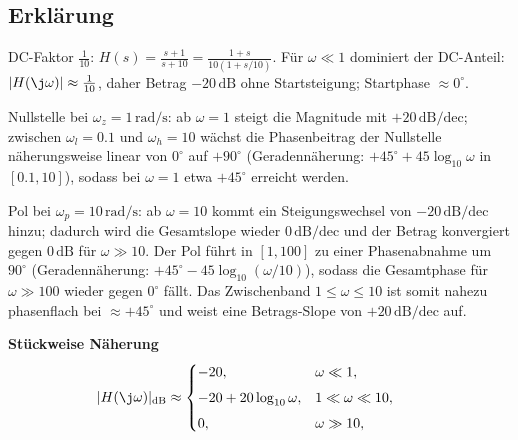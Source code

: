 \begin{center}
\end{center}
\newpage
\subsection{Erklärung}
\vspace{5mm}
\begin{description}[leftmargin=1.2em,labelsep=.6em,font=\bfseries]
\item[Schritt 1] DC-Faktor $\tfrac{1}{10}$: $H(s)=\tfrac{s+1}{s+10}=\tfrac{1+s}{10(1+s/10)}$. Für $\omega\ll1$ dominiert der DC-Anteil: $|H(\j\omega)|\approx\tfrac{1}{10}$, daher Betrag $-20\,\mathrm{dB}$ ohne Startsteigung; Startphase $\approx0^\circ$.
\item[Schritt 2] Nullstelle bei $\omega_z=1\,\mathrm{rad/s}$: ab $\omega=1$ steigt die Magnitude mit $+20\,\mathrm{dB/dec}$; zwischen $\omega_l=0.1$ und $\omega_h=10$ wächst die Phasenbeitrag der Nullstelle näherungsweise linear von $0^\circ$ auf $+90^\circ$ (Geradennäherung: $+45^\circ+45\log_{10}\omega$ in $[0.1,10]$), sodass bei $\omega=1$ etwa $+45^\circ$ erreicht werden.
\item[Schritt 3] Pol bei $\omega_p=10\,\mathrm{rad/s}$: ab $\omega=10$ kommt ein Steigungswechsel von $-20\,\mathrm{dB/dec}$ hinzu; dadurch wird die Gesamtslope wieder $0\,\mathrm{dB/dec}$ und der Betrag konvergiert gegen $0\,\mathrm{dB}$ für $\omega\gg10$. Der Pol führt in $[1,100]$ zu einer Phasenabnahme um $90^\circ$ (Geradennäherung: $+45^\circ-45\log_{10}(\omega/10)$), sodass die Gesamtphase für $\omega\gg100$ wieder gegen $0^\circ$ fällt. Das Zwischenband $1\le\omega\le10$ ist somit nahezu phasenflach bei $\approx+45^\circ$ und weist eine Betrags-Slope von $+20\,\mathrm{dB/dec}$ auf.
\end{description}

\vspace{0.5cm}
\medskip
\noindent\textbf{Stückweise Näherung}
\[
|H(\j\omega)|_{\mathrm{dB}}\approx
\begin{cases}
-20,& \omega\ll1,\\[4pt]
-20+20\log_{10}\omega,& 1\ll\omega\ll10,\\[4pt]
0,& \omega\gg10,
\end{cases}
\qquad
\]
\newpage